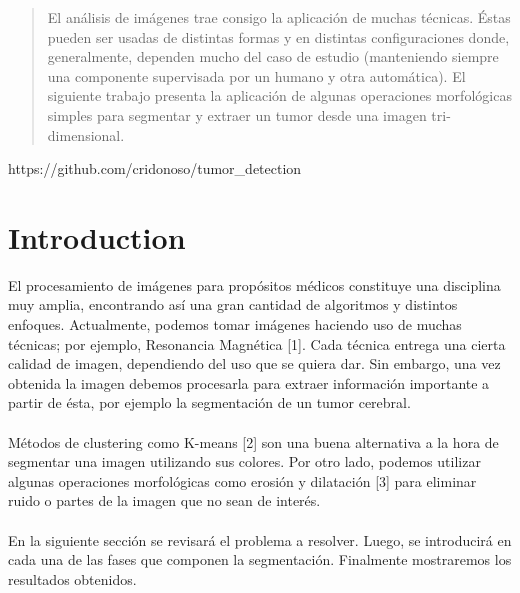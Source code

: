 \documentclass[conference]{IEEEtran}
\begin{document}




\maketitle


\begin{abstract}
El análisis de imágenes trae consigo la aplicación de muchas técnicas. Éstas pueden ser usadas de distintas formas y en distintas configuraciones donde, generalmente, dependen mucho del caso de estudio (manteniendo siempre una componente supervisada por un humano y otra automática). El siguiente trabajo presenta la aplicación de algunas operaciones morfológicas simples para segmentar y extraer un tumor desde una imagen tri-dimensional.\\
\end{abstract}
\begin{center}
https://github.com/cridonoso/tumor\_detection
\end{center}




%
\IEEEpeerreviewmaketitle



\section{Introduction}
El procesamiento de imágenes para propósitos médicos constituye una disciplina muy amplia, encontrando así una gran cantidad de algoritmos y distintos enfoques. Actualmente, podemos tomar imágenes haciendo uso de muchas técnicas; por ejemplo, Resonancia Magnética [1]. Cada técnica entrega una cierta calidad de imagen, dependiendo del uso que se quiera dar. Sin embargo, una vez obtenida la imagen debemos procesarla para extraer información importante a partir de ésta, por ejemplo la segmentación de un tumor cerebral.\\\\ Métodos de clustering como K-means [2] son una buena alternativa a la hora de segmentar una imagen utilizando sus colores. Por otro lado, podemos utilizar algunas operaciones morfológicas como erosión y dilatación [3] para eliminar ruido o partes de la imagen que no sean de interés.\\\\En la siguiente sección se revisará el problema a resolver. Luego, se introducirá en cada una de las fases que componen la segmentación. Finalmente mostraremos los resultados obtenidos.
\end{document}
